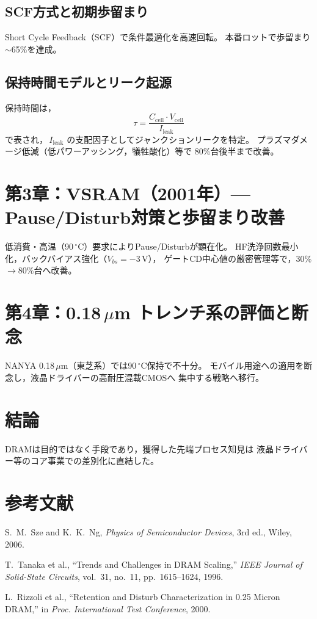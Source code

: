 \documentclass[conference]{IEEEtran}
\begin{document}
\subsection{SCF方式と初期歩留まり}
Short Cycle Feedback（SCF）で条件最適化を高速回転。
本番ロットで歩留まり$\sim$65\%を達成。

\subsection{保持時間モデルとリーク起源}
保持時間は，
\begin{equation}
\tau = \frac{C_{\mathrm{cell}} \cdot V_{\mathrm{cell}}}{I_{\mathrm{leak}}}
\end{equation}
で表され，\,$I_{\mathrm{leak}}$ の支配因子としてジャンクションリークを特定。
プラズマダメージ低減（低パワーアッシング，犠牲酸化）等で
80\%台後半まで改善。

\section{第3章：VSRAM（2001年）— Pause/Disturb対策と歩留まり改善}
低消費・高温（90\,$^\circ$C）要求によりPause/Disturbが顕在化。
HF洗浄回数最小化，バックバイアス強化（$V_{bs}=-3$\,V），
ゲートCD中心値の厳密管理等で，30\%$\rightarrow$80\%台へ改善。

\section{第4章：0.18\,\texorpdfstring{$\mu$m}{μm} トレンチ系の評価と断念}
NANYA 0.18\,$\mu$m（東芝系）では90\,$^\circ$C保持で不十分。
モバイル用途への適用を断念し，液晶ドライバーの高耐圧混載CMOSへ
集中する戦略へ移行。

\section{結論}
DRAMは目的ではなく手段であり，獲得した先端プロセス知見は
液晶ドライバー等のコア事業での差別化に直結した。

\section*{参考文献}
\begin{thebibliography}{00}
S.~M.~Sze and K.~K.~Ng, \emph{Physics of Semiconductor Devices}, 3rd ed., Wiley, 2006.

T.~Tanaka et al., ``Trends and Challenges in DRAM Scaling,'' \emph{IEEE Journal of Solid-State Circuits}, vol.~31, no.~11, pp.~1615--1624, 1996.

L.~Rizzoli et al., ``Retention and Disturb Characterization in 0.25 Micron DRAM,'' in \emph{Proc. International Test Conference}, 2000.
\end{thebibliography}
\end{document}
